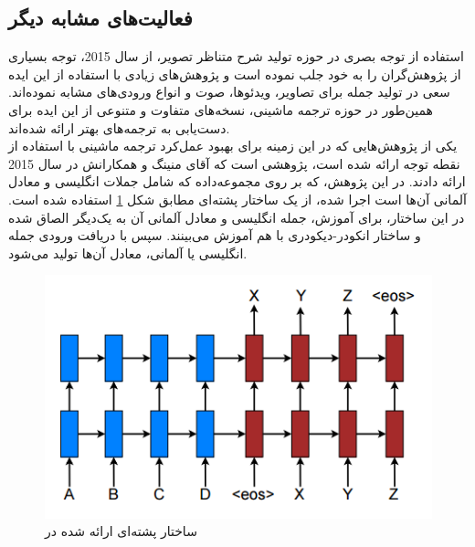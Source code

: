 \subsection{فعالیت‌های مشابه دیگر}
استفاده از توجه بصری در حوزه تولید شرح متناظر تصویر، از سال 2015، توجه بسیاری از پژوهش‌گران را به خود جلب نموده است و پژوهش‌های زیادی با استفاده از این ایده سعی در تولید جمله برای تصاویر، ویدئو‌ها، صوت و انواع ورودی‌های مشابه نموده‌اند. همین‌طور در حوزه ترجمه ماشینی، نسخه‌های متفاوت و متنوعی از این ایده برای دست‌یابی به ترجمه‌های بهتر ارائه شده‌اند.
\\
یکی از پژوهش‌هایی که در این زمینه برای بهبود عمل‌کرد ترجمه ماشینی با استفاده از نقطه توجه ارائه شده است، پژوهشی است که آقای منینگ و همکارانش در سال 2015 ارائه دادند\cite{luong2015effective}.  در این پژوهش، که بر روی مجموعه‌داده  که شامل جملات انگلیسی و معادل آلمانی آن‌ها است اجرا شده، از یک ساختار پشته‌ای مطابق شکل \ref{fig:5-abnmt} استفاده شده است. در این ساختار، برای آموزش، جمله انگلیسی و معادل آلمانی آن به یک‌دیگر الصاق شده و ساختار انکودر-دیکودری با هم آموزش می‌بینند. سپس با دریافت ورودی جمله انگلیسی یا آلمانی، معادل آن‌ها تولید می‌شود.



\begin{figure}[h]
\centering
\includegraphics[scale=0.8]{Imgs/abnmt.png}
\caption{ساختار پشته‌ای ارائه شده در \cite{luong2015effective}}
\label{fig:5-abnmt}
\end{figure}

